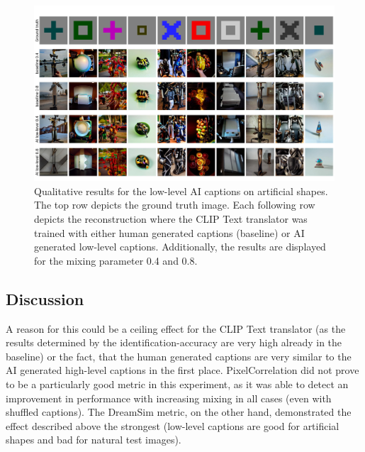 \begin{figure}[ht]
    \centering
    \includegraphics[width=1\textwidth]{plots/aicap_qual_art.JPEG}
    \caption[Experiment 2: Reconstructed images for artificial shapes]{Qualitative results for the low-level AI captions on artificial shapes. The top row depicts the ground truth image. Each following row depicts the reconstruction where the CLIP Text translator was trained with either human generated captions (baseline) or AI generated low-level captions. Additionally, the results are displayed for the mixing parameter 0.4 and 0.8.}\label{fig:aicap_qual_art}
\end{figure}

\subsection{Discussion}


 A reason for this could be a ceiling effect for the CLIP Text translator (as the results determined by the identification-accuracy are very high already in the baseline) or the fact, that the human generated captions are very similar to the AI generated high-level captions in the first place. PixelCorrelation did not prove to be a particularly good metric in this experiment, as it was able to detect an improvement in performance with increasing mixing in all cases (even with shuffled captions). The DreamSim metric, on the other hand,  demonstrated the effect described above the strongest (low-level captions are good for artificial shapes and bad for natural test images). 

